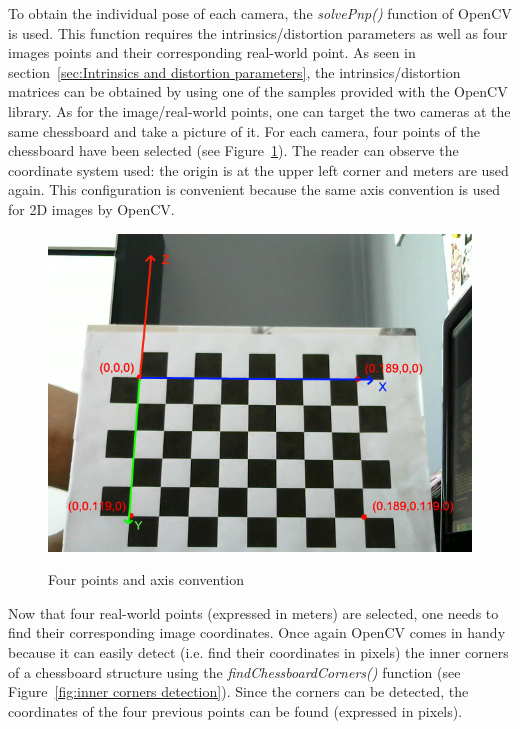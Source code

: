 To obtain the individual pose of each camera, the \textit{solvePnp()} function of OpenCV is used. This function requires the intrinsics/distortion parameters as well as four images points and their corresponding real-world point. As seen in section~\ref{sec:Intrinsics and distortion parameters}, the intrinsics/distortion matrices can be obtained by using one of the samples provided with the OpenCV library. As for the image/real-world points, one can target the two cameras at the same chessboard and take a picture of it. For each camera, four points of the chessboard have been selected (see Figure~\ref{fig:four points}). The reader can observe the coordinate system used: the origin is at the upper left corner and meters are used again. This configuration is convenient because the same axis convention is used for 2D images by OpenCV.\\

\begin{figure}
\caption{Four points and axis convention}
\centering
    \includegraphics[width=1.0\textwidth]{images/fourPoints.jpg}
\label{fig:four points}
\end{figure}

Now that four real-world points (expressed in meters) are selected, one needs to find their corresponding image coordinates. Once again OpenCV comes in handy because it can easily detect (i.e. find their coordinates in pixels) the inner corners of a chessboard structure using the \textit{findChessboardCorners()} function (see Figure~\ref{fig:inner corners detection}). Since the corners can be detected, the coordinates of the four previous points can be found (expressed in pixels).

